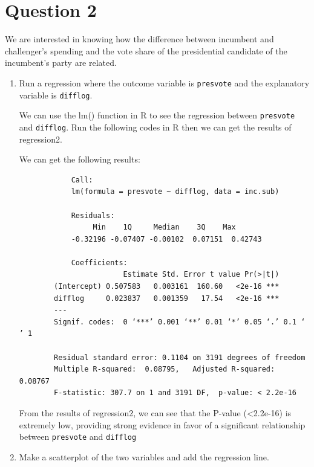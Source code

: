 \documentclass[12pt,letterpaper]{article}
\begin{document}
\section*{Question 2}
\noindent We are interested in knowing how the difference between incumbent and challenger's spending and the vote share of the presidential candidate of the incumbent's party are related.	\vspace{.25cm}
	\begin{enumerate}
		\item Run a regression where the outcome variable is \texttt{presvote} and the explanatory variable is \texttt{difflog}.	\vspace{.15cm}
		
		  \noindent  We can use the lm() function in R to see the regression between \texttt{presvote} and \texttt{difflog}. Run the following codes in R then we can get the results of regression2.	\vspace{.15cm}
		
		
		
		\noindent We can get the following results: \vspace{.15cm}
		\begin{verbatim}
			Call:
			lm(formula = presvote ~ difflog, data = inc.sub)
			
			Residuals:
			     Min    1Q     Median    3Q    Max 
			-0.32196 -0.07407 -0.00102  0.07151  0.42743 
			
			Coefficients:
			            Estimate Std. Error t value Pr(>|t|)    
		(Intercept) 0.507583   0.003161  160.60   <2e-16 ***
		difflog     0.023837   0.001359   17.54   <2e-16 ***
		---
		Signif. codes:  0 ‘***’ 0.001 ‘**’ 0.01 ‘*’ 0.05 ‘.’ 0.1 ‘ ’ 1
		
		Residual standard error: 0.1104 on 3191 degrees of freedom
		Multiple R-squared:  0.08795,	Adjusted R-squared:  0.08767 
		F-statistic: 307.7 on 1 and 3191 DF,  p-value: < 2.2e-16
		\end{verbatim}
		\vspace{.15cm}
		
		\noindent From the results of regression2, we can see that the P-value (\textless 2.2e-16) is extremely low, providing strong evidence in favor of a significant relationship between \texttt{presvote} and \texttt{difflog}\\ \vspace{.15cm}
		
		\item Make a scatterplot of the two variables and add the regression line. 	\vspace{.15cm}
		

\end{enumerate}
\end{document}
